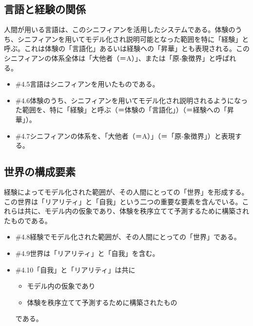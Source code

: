 \subsection{言語と経験の関係}\label{ux8a00ux8a9eux3068ux7d4cux9a13ux306eux95a2ux4fc2}

人間が用いる言語は、このシニフィアンを活用したシステムである。体験のうち、シニフィアンを用いてモデル化され説明可能となった範囲を特に「経験」と呼ぶ。これは体験の「言語化」あるいは経験への「昇華」とも表現される。このシニフィアンの体系全体は「大他者（＝A）」、または「原‐象徴界」と呼ばれる。

\begin{note}{}
  \begin{itemize}
    \tightlist
    \item{\#4.5}言語はシニフィアンを用いたものである。
    \item{\#4.6}体験のうち、シニフィアンを用いてモデル化され説明されるようになった範囲を、特に「経験」と呼ぶ（＝体験の「言語化」）（＝経験への「昇華」）。
    \item{\#4.7}シニフィアンの体系を、「大他者（＝A）」（＝「原‐象徴界」）と表現する。
  \end{itemize}
\end{note}

\subsection{世界の構成要素}\label{ux4e16ux754cux306eux69cbux6210ux8981ux7d20}

経験によってモデル化された範囲が、その人間にとっての「世界」を形成する。この世界は「リアリティ」と「自我」という二つの重要な要素を含んでいる。これらは共に、モデル内の仮象であり、体験を秩序立てて予測するために構築されたものである。

\begin{note}{}
  \begin{itemize}
    \tightlist
    \item{\#4.8}経験でモデル化された範囲が、その人間にとっての「世界」である。
    \item{\#4.9}世界は「リアリティ」と「自我」を含む。
    \item{\#4.10}「自我」と「リアリティ」は共に
      \begin{itemize}
        \tightlist
        \item モデル内の仮象であり
        \item 体験を秩序立てて予測するために構築されたもの
      \end{itemize}である。
  \end{itemize}
\end{note}

